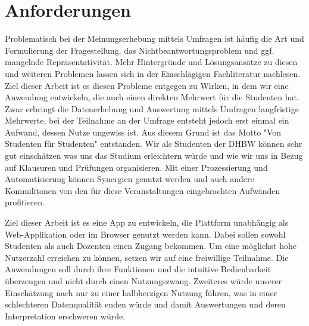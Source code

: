 \section{Anforderungen}
Problematisch bei der Meinungserhebung mittels Umfragen ist häufig die Art und Formulierung der Fragestellung, das Nichtbeantwortungsproblem und ggf. mangelnde Repräsentativität.
Mehr Hintergründe und Lösungsansätze zu diesen und weiteren Problemen lassen sich in der Einschlägigen Fachliteratur nachlesen.
Ziel dieser Arbeit ist es diesen Probleme entgegen zu Wirken, in dem wir eine Anwendung entwickeln, die auch einen direkten Mehrwert für die Studenten hat.
Zwar erbringt die Datenerhebung und Auswertung mittels Umfragen langfristige Mehrwerte, bei der Teilnahme an der Umfrage entsteht jedoch erst einmal ein Aufwand, dessen Nutze ungewiss ist.
Aus diesem Grund ist das Motto "Von Studenten für Studenten" entstanden.
Wir als Studenten der DHBW können sehr gut einschätzen was uns das Studium erleichtern würde und wie wir uns in Bezug auf Klausuren und Prüfungen organisieren.
Mit einer Prozessierung und Automatisierung können Synergien genutzt werden und auch andere Kommilitonen von den für diese Veranstaltungen eingebrachten Aufwänden profitieren. 

Ziel dieser Arbeit ist es eine App zu entwickeln, die Plattform unabhängig als Web-Applikation oder im Browser genutzt werden kann.
Dabei sollen sowohl Studenten als auch Dozenten einen Zugang bekommen.
Um eine möglichst hohe Nutzerzahl erreichen zu können, setzen wir auf eine freiwillige Teilnahme.
Die Anwendungen soll durch ihre Funktionen und die intuitive Bedienbarkeit überzeugen und nicht durch einen Nutzungszwang.
Zweiteres würde unserer Einschätzung nach nur zu einer halbherzigen Nutzung führen, was in einer schlechteren Datenqualität enden würde und damit Auswertungen und deren Interpretation erschweren würde. 

